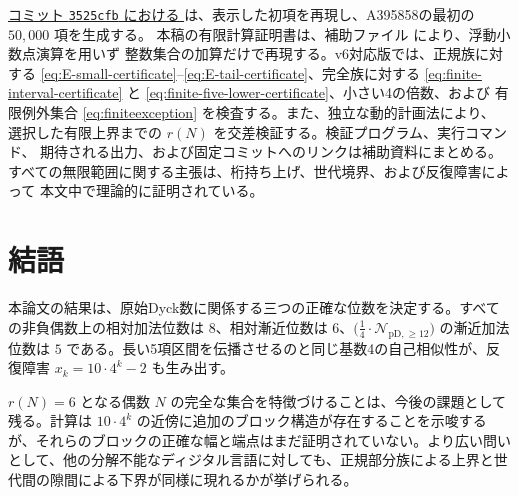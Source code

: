 \documentclass[12pt]{ltjsarticle}
\theoremstyle{plain}
\theoremstyle{definition}
\theoremstyle{plain}
\newcommand{\Pset}{%
  \bigl(\tfrac{1}{4}\cdot\mathcal{N}_{\mathrm{pD},\geq 12}\bigr)%
}
\begin{document}
\href{https://github.com/growupkuriyama-hub/lean_cfg_project/blob/3525cfb/LeanCfgProject/PrimDyck/A395858.py}{コミット \texttt{3525cfb} における }
は、表示した初項を再現し、A395858の最初の $50{,}000$ 項を生成する。
本稿の有限計算証明書は、補助ファイル
 により、浮動小数点演算を用いず
整数集合の加算だけで再現する。v6対応版では、正規族に対する
\eqref{eq:E-small-certificate}--\eqref{eq:E-tail-certificate}、完全族に対する
\eqref{eq:finite-interval-certificate} と
\eqref{eq:finite-five-lower-certificate}、小さい4の倍数、および
有限例外集合 \eqref{eq:finiteexception} を検査する。また、独立な動的計画法により、
選択した有限上界までの $r(N)$ を交差検証する。検証プログラム、実行コマンド、
期待される出力、および固定コミットへのリンクは補助資料にまとめる。
すべての無限範囲に関する主張は、桁持ち上げ、世代境界、および反復障害によって
本文中で理論的に証明されている。

\section{結語}

本論文の結果は、原始Dyck数に関係する三つの正確な位数を決定する。すべての非負偶数上の相対加法位数は $8$、相対漸近位数は $6$、$\Pset$ の漸近加法位数は $5$ である。長い5項区間を伝播させるのと同じ基数4の自己相似性が、反復障害 $x_k=10\cdot4^k-2$ も生み出す。

$r(N)=6$ となる偶数 $N$ の完全な集合を特徴づけることは、今後の課題として残る。計算は $10\cdot4^k$ の近傍に追加のブロック構造が存在することを示唆するが、それらのブロックの正確な幅と端点はまだ証明されていない。より広い問いとして、他の分解不能なディジタル言語に対しても、正規部分族による上界と世代間の隙間による下界が同様に現れるかが挙げられる。
\end{document}
